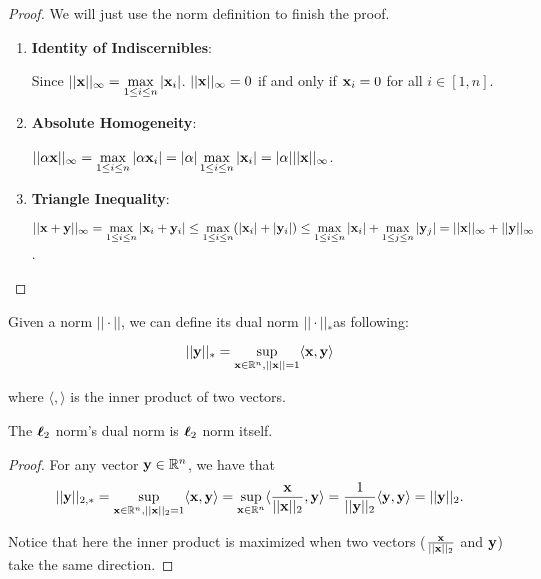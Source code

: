 \documentclass[main.tex]{subfiles}
\begin{document}
\begin{proof} 
	We will just use the norm definition to finish the proof.
	\begin{enumerate}
		\item \textbf{Identity of Indiscernibles}: 
		
		Since $||\mathbf{x}||_\infty = \max\limits_{1 \leq i \leq n} |\mathbf{x}_i|$. $||\mathbf{x}||_\infty = 0 $ if and only if $\mathbf{x}_i = 0$ for all $i \in [1, n]$.
		\item \textbf{Absolute Homogeneity}: 
		
		$||\alpha \mathbf{x}||_\infty = \max\limits_{1 \leq i \leq n}  |\alpha \mathbf{x}_i| = |\alpha| \max\limits_{1 \leq i \leq n}  |\mathbf{x}_i| = |\alpha| ||\mathbf{x}||_\infty$.
		\item \textbf{Triangle Inequality}: 
		
		$||\mathbf{x} + \mathbf{y}||_\infty = \max\limits_{1 \leq i \leq n}  |\mathbf{x}_i + \mathbf{y}_i|  \leq \max\limits_{1 \leq i \leq n} ( |\mathbf{x}_i| + |\mathbf{y}_i|)  \leq \max\limits_{1 \leq i \leq n}  |\mathbf{x}_i| +\max\limits_{1 \leq j \leq n}  |\mathbf{y}_j| = ||\mathbf{x}||_\infty + ||\mathbf{y}||_\infty$.
	\end{enumerate}
\end{proof}

\begin{definition}
	Given a norm $||\cdot||$, we can define its dual norm $||\cdot||_{*}$as following:
	
	\begin{equation}
		||\mathbf{y}||_* = \sup\limits_{\mathbf{x} \in \mathbb{R}^n, ||\mathbf{x}|| = 1} \langle \mathbf{x}, \mathbf{y} \rangle
	\end{equation}
	
	where $\langle, \rangle$ is the inner product of two vectors.
\end{definition}

\begin{claim}
	The $\boldsymbol{\ell}_2$ norm's dual norm is $\boldsymbol{\ell}_2$ norm itself.
\end{claim}

\begin{proof}
	For any vector $\mathbf{y} \in \mathbb{R}^n$, we have that
	\begin{equation*}
	||\mathbf{y}||_{2,*} = \sup\limits_{\mathbf{x} \in \mathbb{R}^n, ||\mathbf{x}||_2 = 1} \langle \mathbf{x}, \mathbf{y} \rangle = \sup\limits_{\mathbf{x} \in \mathbb{R}^n} \langle \frac{\mathbf{x}}{||\mathbf{x}||_2}, \mathbf{y} \rangle = \frac{1}{||\mathbf{y}||_2} \langle \mathbf{y}, \mathbf{y} \rangle = ||\mathbf{y}||_2. 
	\end{equation*}
	
	Notice that here the inner product is maximized when two vectors ($\frac{\mathbf{x}}{||\mathbf{x}||_2}$ and $\mathbf{y}$) take the same direction.
\end{proof}
\end{document}
